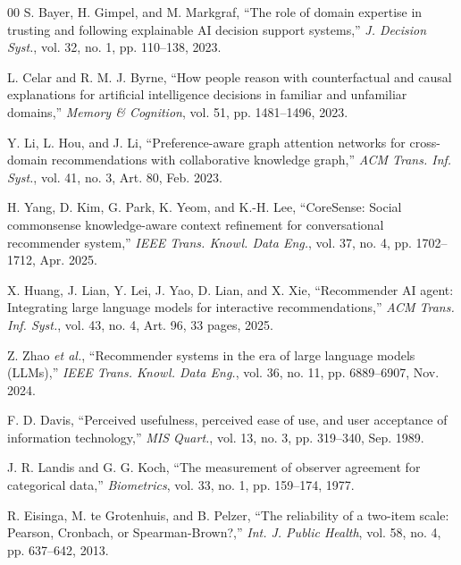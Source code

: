 \documentclass[conference]{IEEEtran}
\begin{document}
\begin{thebibliography}{00}
S. Bayer, H. Gimpel, and M. Markgraf, ``The role of domain expertise in trusting and
following explainable AI decision support systems,'' \textit{J. Decision Syst.},
vol. 32, no. 1, pp. 110--138, 2023.

L. Celar and R. M. J. Byrne, ``How people reason with counterfactual and causal
explanations for artificial intelligence decisions in familiar and unfamiliar
domains,'' \textit{Memory \& Cognition}, vol. 51, pp. 1481--1496, 2023.

Y. Li, L. Hou, and J. Li, ``Preference-aware graph attention networks for
cross-domain recommendations with collaborative knowledge graph,'' \textit{ACM Trans.
Inf. Syst.}, vol. 41, no. 3, Art. 80, Feb. 2023.

H. Yang, D. Kim, G. Park, K. Yeom, and K.-H. Lee, ``CoreSense: Social commonsense
knowledge-aware context refinement for conversational recommender system,''
\textit{IEEE Trans. Knowl. Data Eng.}, vol. 37, no. 4, pp. 1702--1712, Apr. 2025.

X. Huang, J. Lian, Y. Lei, J. Yao, D. Lian, and X. Xie, ``Recommender AI agent:
Integrating large language models for interactive recommendations,'' \textit{ACM Trans.
Inf. Syst.}, vol. 43, no. 4, Art. 96, 33 pages, 2025.

Z. Zhao \textit{et al.}, ``Recommender systems in the era of large language models
(LLMs),'' \textit{IEEE Trans. Knowl. Data Eng.}, vol. 36, no. 11, pp. 6889--6907,
Nov. 2024.

F. D. Davis, ``Perceived usefulness, perceived ease of use, and user acceptance of
information technology,'' \textit{MIS Quart.}, vol. 13, no. 3, pp. 319--340, Sep. 1989.

J. R. Landis and G. G. Koch, ``The measurement of observer agreement for categorical
data,'' \textit{Biometrics}, vol. 33, no. 1, pp. 159--174, 1977.

R. Eisinga, M. te Grotenhuis, and B. Pelzer, ``The reliability of a two-item scale:
Pearson, Cronbach, or Spearman-Brown?,'' \textit{Int. J. Public Health}, vol. 58,
no. 4, pp. 637--642, 2013.

\end{thebibliography}
\end{document}
